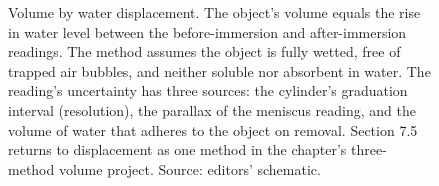 \begin{figure}[ht]
\caption[Volume by water displacement]{Volume by water displacement.
The object's volume equals the rise in water level between the
before-immersion and after-immersion readings. The method assumes the
object is fully wetted, free of trapped air bubbles, and neither
soluble nor absorbent in water. The reading's uncertainty has three
sources: the cylinder's graduation interval (resolution), the
parallax of the meniscus reading, and the volume of water that
adheres to the object on removal. Section 7.5 returns to displacement
as one method in the chapter's three-method volume project. Source:
editors' schematic.}
\label{fig:vol01:ch07:volume-displacement}
\end{figure}
